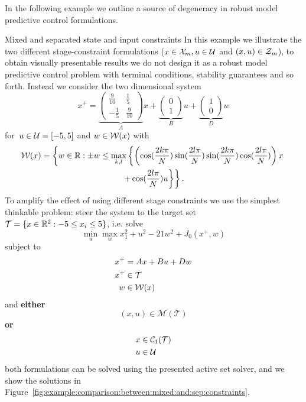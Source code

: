 %
%
%
%
%
In the following example we outline a source of degeneracy in robust model predictive control formulations.
%
\begin{example}{Mixed and separated state and input constraints}\label{example:mixed:and:separated:constraints}
In this example we illustrate the two different stage-constraint formulations ($x\in\mathcal X_m,u\in\mathcal U$ and $(x,u)\in\mathcal Z_m$), to obtain visually presentable results we do not design it as a robust model predictive control problem with terminal conditions, stability guarantees and so forth.
%
Instead we consider the two dimensional system
%
\[
x^+ = \underbrace{\begin{pmatrix}\frac{9}{10}&\frac{1}{5}\\-\frac{1}{5}&\frac{9}{10}\end{pmatrix}}_A x + \underbrace{\begin{pmatrix}0\\1\end{pmatrix}}_B u + \underbrace{\begin{pmatrix}1\\0\end{pmatrix}}_D w
\]
%
for~$u\in\mathcal U=[-5,5]$ and $w\in\mathcal W(x)$ with
%
\begin{multline*}
	\mathcal W(x)=\left\{w\in\mathbb R:\pm w\leq \max_{k,l}\left\{\left(\cos(\frac{2k\pi}{N})\sin(\frac{2l\pi}{N}) \sin(\frac{2k\pi}{N})\cos(\frac{2l\pi}{N})\right)x\right.\right.\\
	\left.\left.+\cos(\frac{2l\pi}{N})u\right\}\right\}.
\end{multline*}
%
To amplify the effect of using different stage constraints we use the simplest thinkable problem: steer the system to the target set~$\mathcal T=\{x\in\mathbb R^2:-5\leq x_i\leq 5\}$, i.e. solve
%
\[
\min_u\max_w x_1^2+u^2-21 w^2 + J_0(x^+,w)
\]
%
subject to
\[\begin{aligned}
x^+& =Ax+Bu+Dw\\
x^+&\in\mathcal T\\
w&\in\mathcal W(x)
\end{aligned}
\]
%
and \textbf{either}
%
\[
(x,u)\in\mathcal M(\mathcal T)
\]
%
\textbf{or}
%
\[\begin{aligned}
x&\in\mathcal C_1(\mathcal T)\\
u&\in\mathcal U
\end{aligned}
\]
%
both formulations can be solved using the presented active set solver, and we show the solutions in Figure~\ref{fig:example:comparison:between:mixed:and:sep:constraints}.
%
\begin{figure}
\centering
{}

%
\end{figure}
\end{example}
